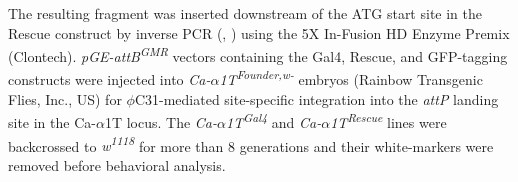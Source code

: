 The resulting fragment was inserted downstream of the ATG start site in the Rescue construct by inverse PCR (, ) using the 5X In-Fusion HD Enzyme Premix (Clontech).       
\emph{pGE-attB\textsuperscript{GMR}} vectors containing the Gal4, Rescue, and GFP-tagging constructs were injected into \emph{Ca-$\alpha$1T\textsuperscript{Founder,w-}} embryos (Rainbow Transgenic Flies, Inc., US) for $\phi$C31-mediated site-specific integration into the \emph{attP} landing site in the Ca-$\alpha$1T locus.
The \emph{Ca-$\alpha$1T\textsuperscript{Gal4}} and \emph{Ca-$\alpha$1T\textsuperscript{Rescue}} lines were backcrossed to \emph{w\textsuperscript{1118}} for more than 8 generations and their white-markers were removed before behavioral analysis.
